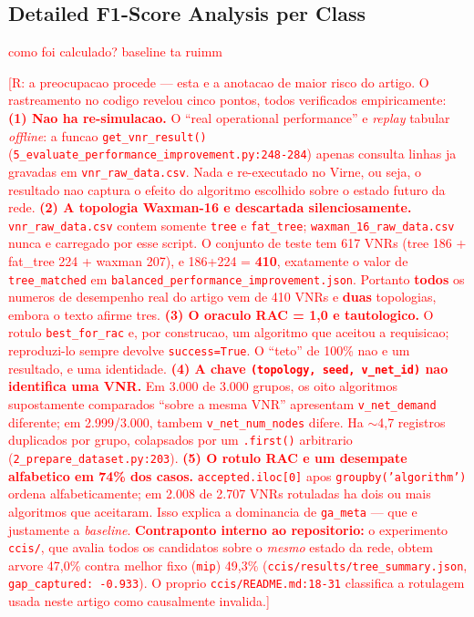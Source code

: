 \documentclass[runningheads]{llncs}
\begin{document}
\subsection{Detailed F1-Score Analysis per Class}
\textcolor{red}{como foi calculado? baseline ta ruimm}

\textcolor{red}{[R: a preocupacao procede --- esta e a anotacao de maior risco do artigo. O rastreamento no codigo revelou cinco pontos, todos verificados empiricamente:
\textbf{(1) Nao ha re-simulacao.} O ``real operational performance'' e \emph{replay} tabular \emph{offline}: a funcao \texttt{get\_vnr\_result()} (\texttt{5\_evaluate\_performance\_improvement.py:248-284}) apenas consulta linhas ja gravadas em \texttt{vnr\_raw\_data.csv}. Nada e re-executado no Virne, ou seja, o resultado nao captura o efeito do algoritmo escolhido sobre o estado futuro da rede.
\textbf{(2) A topologia Waxman-16 e descartada silenciosamente.} \texttt{vnr\_raw\_data.csv} contem somente \texttt{tree} e \texttt{fat\_tree}; \texttt{waxman\_16\_raw\_data.csv} nunca e carregado por esse script. O conjunto de teste tem 617 VNRs (tree 186 + fat\_tree 224 + waxman 207), e 186+224 = \textbf{410}, exatamente o valor de \texttt{tree\_matched} em \texttt{balanced\_performance\_improvement.json}. Portanto \textbf{todos} os numeros de desempenho real do artigo vem de 410 VNRs e \textbf{duas} topologias, embora o texto afirme tres.
\textbf{(3) O oraculo RAC = 1,0 e tautologico.} O rotulo \texttt{best\_for\_rac} e, por construcao, um algoritmo que aceitou a requisicao; reproduzi-lo sempre devolve \texttt{success=True}. O ``teto'' de 100\% nao e um resultado, e uma identidade.
\textbf{(4) A chave \texttt{(topology, seed, v\_net\_id)} nao identifica uma VNR.} Em 3.000 de 3.000 grupos, os oito algoritmos supostamente comparados ``sobre a mesma VNR'' apresentam \texttt{v\_net\_demand} diferente; em 2.999/3.000, tambem \texttt{v\_net\_num\_nodes} difere. Ha $\sim$4,7 registros duplicados por grupo, colapsados por um \texttt{.first()} arbitrario (\texttt{2\_prepare\_dataset.py:203}).
\textbf{(5) O rotulo RAC e um desempate alfabetico em 74\% dos casos.} \texttt{accepted.iloc[0]} apos \texttt{groupby('algorithm')} ordena alfabeticamente; em 2.008 de 2.707 VNRs rotuladas ha dois ou mais algoritmos que aceitaram. Isso explica a dominancia de \texttt{ga\_meta} --- que e justamente a \emph{baseline}.
\textbf{Contraponto interno ao repositorio:} o experimento \texttt{ccis/}, que avalia todos os candidatos sobre o \emph{mesmo} estado da rede, obtem arvore 47,0\% contra melhor fixo (\texttt{mip}) 49,3\% (\texttt{ccis/results/tree\_summary.json}, \texttt{gap\_captured: -0.933}). O proprio \texttt{ccis/README.md:18-31} classifica a rotulagem usada neste artigo como causalmente invalida.]}
\end{document}
